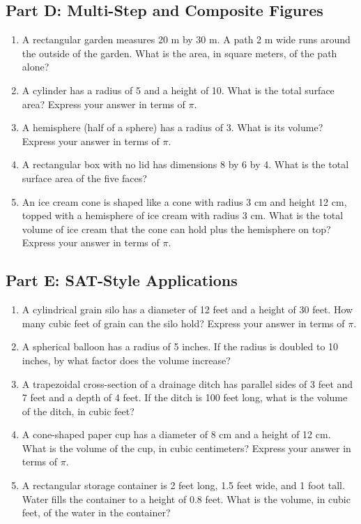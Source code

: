 \documentclass[14pt]{extarticle}
\begin{document}
\subsection*{Part D: Multi-Step and Composite Figures}
\begin{enumerate}
  \item A rectangular garden measures 20 m by 30 m. A path 2 m wide runs around the outside of the garden. What is the area, in square meters, of the path alone?
  \item A cylinder has a radius of 5 and a height of 10. What is the total surface area? Express your answer in terms of \(\pi\).
  \item A hemisphere (half of a sphere) has a radius of 3. What is its volume? Express your answer in terms of \(\pi\).
  \item A rectangular box with no lid has dimensions 8 by 6 by 4. What is the total surface area of the five faces?
  \item An ice cream cone is shaped like a cone with radius 3 cm and height 12 cm, topped with a hemisphere of ice cream with radius 3 cm. What is the total volume of ice cream that the cone can hold plus the hemisphere on top? Express your answer in terms of \(\pi\).
\end{enumerate}

\subsection*{Part E: SAT-Style Applications}
\begin{enumerate}
  \item A cylindrical grain silo has a diameter of 12 feet and a height of 30 feet. How many cubic feet of grain can the silo hold? Express your answer in terms of \(\pi\).
  \item A spherical balloon has a radius of 5 inches. If the radius is doubled to 10 inches, by what factor does the volume increase?
  \item A trapezoidal cross-section of a drainage ditch has parallel sides of 3 feet and 7 feet and a depth of 4 feet. If the ditch is 100 feet long, what is the volume of the ditch, in cubic feet?
  \item A cone-shaped paper cup has a diameter of 8 cm and a height of 12 cm. What is the volume of the cup, in cubic centimeters? Express your answer in terms of \(\pi\).
  \item A rectangular storage container is 2 feet long, 1.5 feet wide, and 1 foot tall. Water fills the container to a height of 0.8 feet. What is the volume, in cubic feet, of the water in the container?
\end{enumerate}
\end{document}
